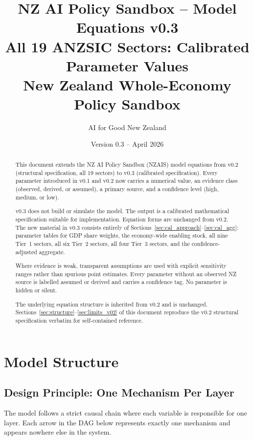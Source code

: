 \documentclass[11pt,a4paper]{article}
\title{%
  NZ AI Policy Sandbox -- Model Equations v0.3\\[0.5em]
  \large All 19 ANZSIC Sectors: Calibrated Parameter Values\\[0.3em]
  \normalsize New Zealand Whole-Economy Policy Sandbox
}
\author{AI for Good New Zealand}
\date{Version 0.3 -- April 2026}
\begin{document}
\maketitle

\begin{abstract}
This document extends the NZ AI Policy Sandbox (NZAIS) model equations from v0.2 (structural specification, all 19 sectors) to v0.3 (calibrated specification). Every parameter introduced in v0.1 and v0.2 now carries a numerical value, an evidence class (observed, derived, or assumed), a primary source, and a confidence level (high, medium, or low).

v0.3 does not build or simulate the model. The output is a calibrated mathematical specification suitable for implementation. Equation forms are unchanged from v0.2. The new material in v0.3 consists entirely of Sections~\ref{sec:cal_approach}--\ref{sec:cal_agg}: parameter tables for GDP share weights, the economy-wide enabling stock, all nine Tier~1 sectors, all six Tier~2 sectors, all four Tier~3 sectors, and the confidence-adjusted aggregate.

Where evidence is weak, transparent assumptions are used with explicit sensitivity ranges rather than spurious point estimates. Every parameter without an observed NZ source is labelled assumed or derived and carries a confidence tag. No parameter is hidden or silent.

The underlying equation structure is inherited from v0.2 and is unchanged. Sections~\ref{sec:structure}--\ref{sec:limits_v02} of this document reproduce the v0.2 structural specification verbatim for self-contained reference.
\end{abstract}

\tableofcontents
\newpage

\section{Model Structure}
\label{sec:structure}

\subsection{Design Principle: One Mechanism Per Layer}

The model follows a strict causal chain where each variable is responsible for one layer. Each arrow in the DAG below represents exactly one mechanism and appears nowhere else in the system.
\end{document}
